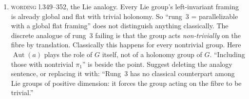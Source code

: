 \documentclass[11pt]{article}
\newcommand{\iss}[1]{\textsc{#1}}
\begin{document}
\begin{enumerate}[label=\textbf{3.\arabic*},leftmargin=*]
\item \iss{wording} l.349--352, the Lie analogy. Every Lie group's left-invariant framing is
already global and flat with trivial holonomy. So ``rung~3 = parallelizable with a global flat
framing'' does not distinguish anything classically. The discrete analogue of rung~3 failing is
that the group acts \emph{non-trivially} on the fibre by translation. Classically this happens for
every nontrivial group. Here $\operatorname{Aut}(a)$ plays the role of $G$ itself, not of a
holonomy group of $G$. ``Including those with nontrivial $\pi_1$'' is beside the point. Suggest
deleting the analogy sentence, or replacing it with: ``Rung~3 has no classical counterpart among
Lie groups of positive dimension: it forces the group acting on the fibre to be trivial.''
\end{enumerate}
\end{document}
